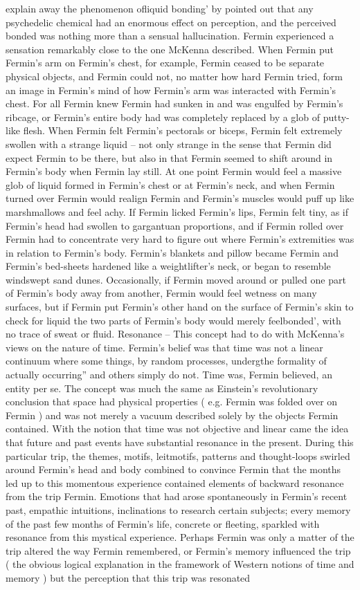 \documentclass[12pt]{book}
\begin{document}
explain away the phenomenon ofliquid bonding' by pointed out that any psychedelic chemical had an enormous effect on perception, and the perceived bonded was nothing more than a sensual hallucination. Fermin experienced a sensation remarkably close to the one McKenna described. When Fermin put Fermin's arm on Fermin's chest, for example, Fermin ceased to be separate physical objects, and Fermin could not, no matter how hard Fermin tried, form an image in Fermin's mind of how Fermin's arm was interacted with Fermin's chest. For all Fermin knew Fermin had sunken in and was engulfed by Fermin's ribcage, or Fermin's entire body had was completely replaced by a glob of putty-like flesh. When Fermin felt Fermin's pectorals or biceps, Fermin felt extremely swollen with a strange liquid -- not only strange in the sense that Fermin did expect Fermin to be there, but also in that Fermin seemed to shift around in Fermin's body when Fermin lay still. At one point Fermin would feel a massive glob of liquid formed in Fermin's chest or at Fermin's neck, and when Fermin turned over Fermin would realign Fermin and Fermin's muscles would puff up like marshmallows and feel achy. If Fermin licked Fermin's lips, Fermin felt tiny, as if Fermin's head had swollen to gargantuan proportions, and if Fermin rolled over Fermin had to concentrate very hard to figure out where Fermin's extremities was in relation to Fermin's body. Fermin's blankets and pillow became Fermin and Fermin's bed-sheets hardened like a weightlifter's neck, or began to resemble windswept sand dunes. Occasionally, if Fermin moved around or pulled one part of Fermin's body away from another, Fermin would feel wetness on many surfaces, but if Fermin put Fermin's other hand on the surface of Fermin's skin to check for liquid the two parts of Fermin's body would merely feelbonded', with no trace of sweat or fluid.  Resonance -- This concept had to do with McKenna's views on the nature of time. Fermin's belief was that time was not a linear continuum where some things, by random processes, undergthe formality of actually occurring'' and others simply do not. Time was, Fermin believed, an entity per se. The concept was much the same as Einstein's revolutionary conclusion that space had physical properties ( e.g. Fermin was folded over on Fermin ) and was not merely a vacuum described solely by the objects Fermin contained. With the notion that time was not objective and linear came the idea that future and past events have substantial resonance in the present. During this particular trip, the themes, motifs, leitmotifs, patterns and thought-loops swirled around Fermin's head and body combined to convince Fermin that the months led up to this momentous experience contained elements of backward resonance from the trip Fermin. Emotions that had arose spontaneously in Fermin's recent past, empathic intuitions, inclinations to research certain subjects; every memory of the past few months of Fermin's life, concrete or fleeting, sparkled with resonance from this mystical experience. Perhaps Fermin was only a matter of the trip altered the way Fermin remembered, or Fermin's memory influenced the trip ( the obvious logical explanation in the framework of Western notions of time and memory ) but the perception that this trip was resonated 
\end{document}

